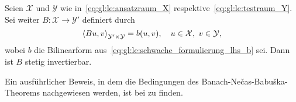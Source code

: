 \begin{Satz}
\label{satz:gl:le:ss09_theorem51}
    Seien $\mathcal X$ und $\mathcal Y$ wie in~\cref{eq:gl:le:ansatzraum_X} respektive~\cref{eq:gl:le:testraum_Y}.
    Sei weiter $B \colon \mathcal X \to \mathcal Y'$ definiert durch
    \begin{equation}
        \label{eq:gl:le:ss09_variationsproblem_als_operatorgleichung}
        \left\langle B u,v\right\rangle_{\mathcal Y' \times \mathcal Y} = b(u, v), \quad u \in \mathcal X,~v \in \mathcal Y,
    \end{equation}
    wobei $b$ die Bilinearform aus~\cref{eq:gl:le:schwache_formulierung_lhs_b} sei.
    Dann ist $B$ stetig invertierbar.

    \begin{Beweis}
        Ein ausführlicher Beweis, in dem die Bedingungen des Banach-Ne\v{c}as-Babu\v{s}ka-Theorems nachgewiesen werden, ist bei \textcite[Appendix A]{Schwab:2009ec} zu finden.



\end{Beweis}
\end{Satz}
